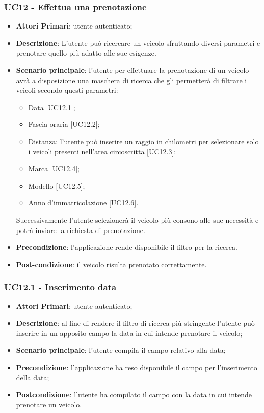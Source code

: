 \subsubsection{UC12 - Effettua una prenotazione}
\begin{itemize}
	\item \textbf{Attori Primari}: utente autenticato;
	\item \textbf{Descrizione}: L'utente può ricercare un veicolo sfruttando diversi parametri e prenotare quello più adatto alle sue esigenze.
	\item \textbf{Scenario principale}: l'utente per effettuare la prenotazione di un veicolo avrà a disposizione una maschera di ricerca che gli permetterà di filtrare i veicoli secondo questi parametri:
	\begin{itemize}
		\item Data [UC12.1];
		\item Fascia oraria [UC12.2];
		\item Distanza: l'utente può inserire un raggio in chilometri per selezionare solo i veicoli presenti nell'area circoscritta [UC12.3]; 
		\item Marca [UC12.4];
		\item Modello [UC12.5];
		\item Anno d'immatricolazione [UC12.6].
	\end{itemize}
	Successivamente l'utente selezionerà il veicolo più consono alle sue necessità e potrà inviare la richiesta di prenotazione.
	\item \textbf{Precondizione}: l'applicazione rende disponibile il filtro per la ricerca.
	\item \textbf{Post-condizione}: il veicolo risulta prenotato correttamente.
\end{itemize} 

\subsubsection{UC12.1 - Inserimento data}
\begin{itemize}
	\item \textbf{Attori Primari}: utente autenticato;
	\item \textbf{Descrizione}: al fine di rendere il filtro di ricerca più stringente l'utente può inserire in un apposito campo la data in cui intende prenotare il veicolo;
	\item \textbf{Scenario principale}: l'utente compila il campo relativo alla data;	
	\item \textbf{Precondizione}: l'applicazione ha reso disponibile il campo per l'inserimento della data;
	\item \textbf{Postcondizione}: l'utente ha compilato il campo con la data in cui intende prenotare un veicolo.	
\end{itemize}

